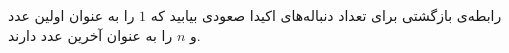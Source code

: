    \p 
رابطه‌ی بازگشتی برای تعداد دنباله‌های اکیدا صعودی بیابید که
$1$
را به عنوان اولین عدد و
$n$
را به عنوان آخرین عدد دارند.